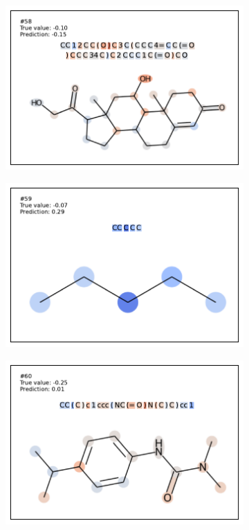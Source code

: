 \begin{figure}[h]
\begin{subfigure}[b]{0.33\textwidth}
\end{subfigure}
\begin{subfigure}[b]{0.33\textwidth} 
  \centering 
  \includegraphics[width=\textwidth]{figures/esol/esol58.pdf} 
\end{subfigure}\begin{subfigure}[b]{0.33\textwidth} 
  \centering 
  \includegraphics[width=\textwidth]{figures/esol/esol59.pdf} 
\end{subfigure}\begin{subfigure}[b]{0.33\textwidth} 
  \centering 
  \includegraphics[width=\textwidth]{figures/esol/esol60.pdf} 
\end{subfigure}



\end{figure}
